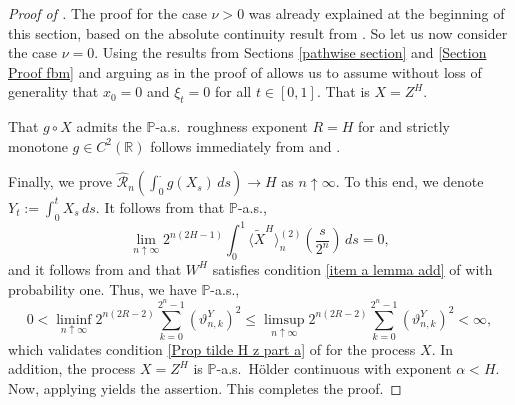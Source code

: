 \documentclass[12pt,reqno]{article}
\def\ua{\uparrow}
\def\wh{\widehat}
\def\wt{\widetilde}
\numberwithin{equation}{section}
\def\cR{{\mathscr R}}
\theoremstyle{definition}
\def\<{\langle}
\def\>{\rangle}
\def\wt#1{\widetilde{#1}}
\def\ua{\uparrow}
\def\wh{\widehat}
\def\wt{\widetilde}
\newcommand{\bR}{\mathbb{R}}
\newcommand{\bP}{\mathbb{P}}
\begin{document}
\begin{proof}[Proof of ] The proof for the case $\nu>0$ was already explained at the beginning of this section, based on the absolute continuity result from \cite[Theorem 20]{PicardRepresentationFBM}. So let us now consider the case $\nu=0$. 
	Using the results from Sections \ref{pathwise section} and \ref{Section Proof fbm} and arguing as in the proof of  allows us to assume without loss of generality that $x_0 = 0$ and $\xi_t  = 0$ for all $t \in [0,1]$. That is $X = Z^H$. 
	
		
	That $g\circ X$ admits the $\bP$-a.s.~roughness exponent $R = H$ for and strictly monotone  $g \in C^2(\bR)$ follows immediately from  and .
	
	Finally, we prove $\wh \cR_n\left(\int_0^\cdot g(X_s)\,ds\right) \rightarrow H$ as $n \ua \infty$. To this end, we denote $Y_t:=\int_0^tX_s\,ds$. It follows from  that $\bP$-a.s.,
	\begin{equation*}
		\lim_{n \ua \infty} 2^{n(2H-1)}\int_0^{1}\<\wt X^H\>^{(2)}_n\left(\frac{s}{2^n}\right)\,ds = 0,
	\end{equation*}
	and it follows from   and  that  $W^H$ satisfies condition \ref{item a lemma add} of  with probability one. Thus, we have $\bP$-a.s.,
	\begin{equation*}
		0< \liminf_{n \ua \infty}2^{n(2{R}-2)}\sum_{k = 0}^{2^n-1}\left(\vartheta^Y_{n,k}\right)^2\le \limsup_{n \ua \infty}2^{n(2{R}-2)}\sum_{k = 0}^{2^{n}-1}\left(\vartheta^Y_{n,k}\right)^2<\infty,
	\end{equation*}
	which validates condition \ref{Prop tilde H z part a} of  for the process $X$. In addition, the process $X = Z^H$ is $\bP$-a.s.~H\"older continuous with exponent $\alpha < H$. Now, applying  yields the assertion. This completes the proof. 
\end{proof}
\end{document}
